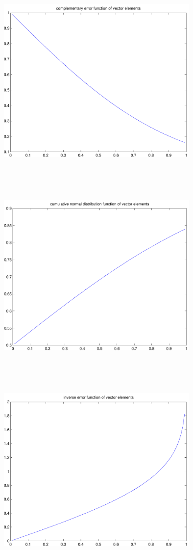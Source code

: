 \documentclass[9pt]{article}
\theoremstyle{plain}
\theoremstyle{definition}
\theoremstyle{remark}
\numberwithin{equation}{section}
\begin{document}
\includegraphics[width=10.0cm,height=10.0cm]{klVSLErfc.pdf}

\includegraphics[width=10.0cm,height=10.0cm]{klVSLCdfNorm.pdf}

\includegraphics[width=10.0cm,height=10.0cm]{klVSLErfInv.pdf}
\end{document}
